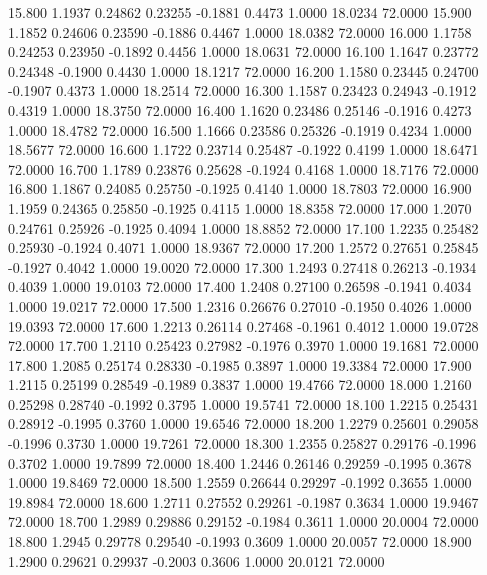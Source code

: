   15.800   1.1937   0.24862   0.23255  -0.1881   0.4473   1.0000  18.0234  72.0000
  15.900   1.1852   0.24606   0.23590  -0.1886   0.4467   1.0000  18.0382  72.0000
  16.000   1.1758   0.24253   0.23950  -0.1892   0.4456   1.0000  18.0631  72.0000
  16.100   1.1647   0.23772   0.24348  -0.1900   0.4430   1.0000  18.1217  72.0000
  16.200   1.1580   0.23445   0.24700  -0.1907   0.4373   1.0000  18.2514  72.0000
  16.300   1.1587   0.23423   0.24943  -0.1912   0.4319   1.0000  18.3750  72.0000
  16.400   1.1620   0.23486   0.25146  -0.1916   0.4273   1.0000  18.4782  72.0000
  16.500   1.1666   0.23586   0.25326  -0.1919   0.4234   1.0000  18.5677  72.0000
  16.600   1.1722   0.23714   0.25487  -0.1922   0.4199   1.0000  18.6471  72.0000
  16.700   1.1789   0.23876   0.25628  -0.1924   0.4168   1.0000  18.7176  72.0000
  16.800   1.1867   0.24085   0.25750  -0.1925   0.4140   1.0000  18.7803  72.0000
  16.900   1.1959   0.24365   0.25850  -0.1925   0.4115   1.0000  18.8358  72.0000
  17.000   1.2070   0.24761   0.25926  -0.1925   0.4094   1.0000  18.8852  72.0000
  17.100   1.2235   0.25482   0.25930  -0.1924   0.4071   1.0000  18.9367  72.0000
  17.200   1.2572   0.27651   0.25845  -0.1927   0.4042   1.0000  19.0020  72.0000
  17.300   1.2493   0.27418   0.26213  -0.1934   0.4039   1.0000  19.0103  72.0000
  17.400   1.2408   0.27100   0.26598  -0.1941   0.4034   1.0000  19.0217  72.0000
  17.500   1.2316   0.26676   0.27010  -0.1950   0.4026   1.0000  19.0393  72.0000
  17.600   1.2213   0.26114   0.27468  -0.1961   0.4012   1.0000  19.0728  72.0000
  17.700   1.2110   0.25423   0.27982  -0.1976   0.3970   1.0000  19.1681  72.0000
  17.800   1.2085   0.25174   0.28330  -0.1985   0.3897   1.0000  19.3384  72.0000
  17.900   1.2115   0.25199   0.28549  -0.1989   0.3837   1.0000  19.4766  72.0000
  18.000   1.2160   0.25298   0.28740  -0.1992   0.3795   1.0000  19.5741  72.0000
  18.100   1.2215   0.25431   0.28912  -0.1995   0.3760   1.0000  19.6546  72.0000
  18.200   1.2279   0.25601   0.29058  -0.1996   0.3730   1.0000  19.7261  72.0000
  18.300   1.2355   0.25827   0.29176  -0.1996   0.3702   1.0000  19.7899  72.0000
  18.400   1.2446   0.26146   0.29259  -0.1995   0.3678   1.0000  19.8469  72.0000
  18.500   1.2559   0.26644   0.29297  -0.1992   0.3655   1.0000  19.8984  72.0000
  18.600   1.2711   0.27552   0.29261  -0.1987   0.3634   1.0000  19.9467  72.0000
  18.700   1.2989   0.29886   0.29152  -0.1984   0.3611   1.0000  20.0004  72.0000
  18.800   1.2945   0.29778   0.29540  -0.1993   0.3609   1.0000  20.0057  72.0000
  18.900   1.2900   0.29621   0.29937  -0.2003   0.3606   1.0000  20.0121  72.0000
